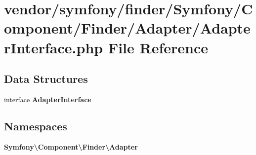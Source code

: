 \section{vendor/symfony/finder/\+Symfony/\+Component/\+Finder/\+Adapter/\+Adapter\+Interface.php File Reference}
\label{symfony_2finder_2_symfony_2_component_2_finder_2_adapter_2_adapter_interface_8php}
\subsection*{Data Structures}
\begin{DoxyCompactItemize}
\item 
interface {\bf Adapter\+Interface}
\end{DoxyCompactItemize}
\subsection*{Namespaces}
\begin{DoxyCompactItemize}
\item 
 {\bf Symfony\textbackslash{}\+Component\textbackslash{}\+Finder\textbackslash{}\+Adapter}
\end{DoxyCompactItemize}
